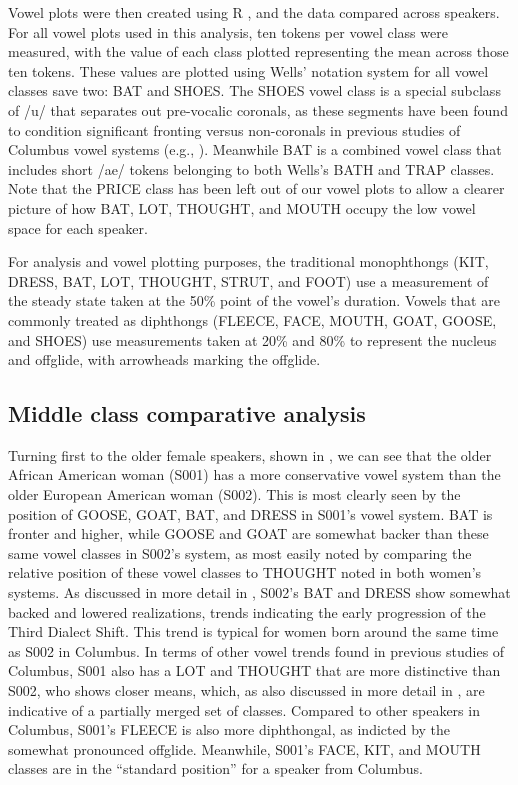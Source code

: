 \documentclass[output=paper,colorlinks,citecolor=brown]{langscibook}
\begin{document}
Vowel plots were then created using R \citep{Rprogram}, and the data compared across speakers. For all vowel plots used in this analysis, ten tokens per vowel class were measured, with the value of each class plotted representing the mean across those ten tokens. These values are plotted using Wells' \citeyear{wells1982accents} notation system for all vowel classes save two: BAT and SHOES. The SHOES vowel class is a special subclass of /u/ that separates out pre-vocalic coronals, as these segments have been found to condition significant fronting versus non-coronals in previous studies of Columbus vowel systems (e.g., \citealt{durian2012new,Durianschumacher2010,Thomas2001acoustic}). Meanwhile BAT is a combined vowel class that includes short /ae/ tokens belonging to both Wells's BATH and TRAP classes.  Note that the PRICE class has been left out of our vowel plots to allow a clearer picture of how BAT, LOT, THOUGHT, and MOUTH occupy the low vowel space for each speaker.

For analysis and vowel plotting purposes, the traditional monophthongs (KIT, DRESS, BAT, LOT, THOUGHT, STRUT, and FOOT) use a measurement of the steady state taken at the 50\% point of the vowel’s duration. Vowels that are commonly treated as diphthongs (FLEECE, FACE, MOUTH, GOAT, GOOSE, and SHOES) use measurements taken at 20\% and 80\% to represent the nucleus and offglide, with arrowheads marking the offglide.

\subsection{Middle class comparative analysis}\label{sec:durian:4.2}

Turning first to the older female speakers, shown in , we can see that the older African American woman (S001) has a more conservative vowel system than the older European American woman (S002). This is most clearly seen by the position of GOOSE, GOAT, BAT, and DRESS in S001's vowel system. BAT is fronter and higher, while GOOSE and GOAT are somewhat backer than these same vowel classes in S002's system, as most easily noted by comparing the relative position of these vowel classes to THOUGHT noted in both women's systems. As discussed in more detail in \citet{durian2012new}, S002's BAT and DRESS show somewhat backed and lowered realizations, trends indicating the early progression of the Third Dialect Shift. This trend is typical for women born around the same time as S002 in Columbus. In terms of other vowel trends found in previous studies of Columbus, S001 also has a LOT and THOUGHT that are more distinctive than S002, who shows closer means, which, as also discussed in more detail in \citet{durian2012new}, are indicative of a partially merged set of classes. Compared to other speakers in Columbus, S001's FLEECE is also more diphthongal, as indicted by the somewhat pronounced offglide. Meanwhile, S001's FACE, KIT, and MOUTH classes are in the ``standard position'' for a speaker from Columbus.
\end{document}
